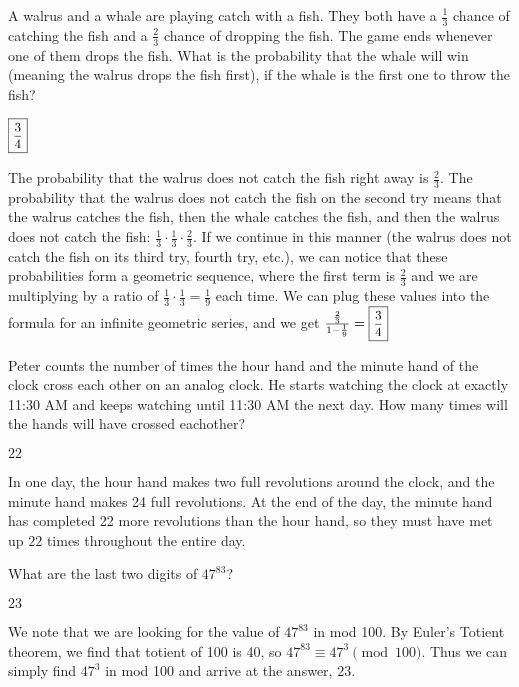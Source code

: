 \documentclass[11pt]{article}
\begin{document}
\begin{problem}
A walrus and a whale are playing catch with a fish. They both have a $\frac{1}{3}$ chance of catching the fish and a $\frac{2}{3}$ chance of dropping the fish. The game ends whenever one of them drops the fish. What is the probability that the whale will win (meaning the walrus drops the fish first), if the whale is the first one to throw the fish?
\end{problem}
\begin{answer}
$\small\boxed{\frac{3}{4}\normalsize}$
\end{answer}
\begin{solution}
The probability that the walrus does not catch the fish right away is $\frac{2}{3}$. The probability that the walrus does not catch the fish on the second try means that the walrus catches the fish, then the whale catches the fish, and then the walrus does not catch the fish: $\frac{1}{3}\cdot\frac{1}{3}\cdot\frac{2}{3}$. If we continue in this manner (the walrus does not catch the fish on its third try, fourth try, etc.), we can notice that these probabilities form a geometric sequence, where the first term is $\frac{2}{3}$ and we are multiplying by a ratio of $\frac{1}{3}\cdot\frac{1}{3} = \frac{1}{9}$ each time. We can plug these values into the formula for an infinite geometric series, and we get $\frac{\frac{2}{3}}{1 - \frac{1}{9}} = \small\boxed{\frac{3}{4}\normalsize}$
\end{solution}

\begin{problem}
Peter counts the number of times the hour hand and the minute hand of the clock cross each other on an analog clock. He starts watching the clock at exactly 11:30 AM and keeps watching until 11:30 AM the next day. How many times will the hands will have crossed eachother?
\end{problem}
\begin{answer}
$\boxed{22}$
\end{answer}
\begin{solution}
In one day, the hour hand makes two full revolutions around the clock, and the minute hand makes 24 full revolutions. At the end of the day, the minute hand has completed 22 more revolutions than the hour hand, so they must have met up $\boxed{22}$ times throughout the entire day.
\end{solution}

\begin{problem}
What are the last two digits of $47^{83}$?
\end{problem}
\begin{answer}
$\boxed{23}$
\end{answer}
\begin{solution}
We note that we are looking for the value of $47^{83}$ in mod 100. By Euler's Totient theorem, we find that totient of 100 is 40, so $47^{83} \equiv 47^3 \pmod{100}$. Thus we can simply find $47^3$ in mod 100 and arrive at the answer, $\boxed{23}$.
\end{solution}
\end{document}
